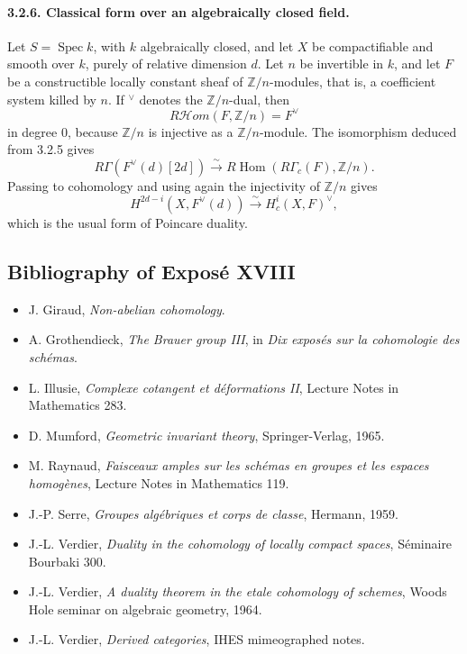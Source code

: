 \documentclass[12pt]{article}
\newcommand{\ZZ}{\mathbb Z}
\DeclareMathOperator{\Spec}{Spec}
\DeclareMathOperator{\Hom}{Hom}
\newcommand{\Hhom}{\mathcal{H}om}
\begin{document}
\paragraph{3.2.6. Classical form over an algebraically closed field.}
Let $S=\Spec k$, with $k$ algebraically closed, and let $X$ be compactifiable and smooth over $k$, purely of relative dimension $d$. Let $n$ be invertible in $k$, and let $F$ be a constructible locally constant sheaf of $\ZZ/n$-modules, that is, a coefficient system killed by $n$. If $^\vee$ denotes the $\ZZ/n$-dual, then
\[
   R\Hhom(F,\ZZ/n)=F^\vee
\]
in degree $0$, because $\ZZ/n$ is injective as a $\ZZ/n$-module. The isomorphism deduced from 3.2.5 gives
\begin{equation}
   R\Gamma(F^\vee(d)[2d])\xrightarrow{\sim}R\Hom(R\Gamma_c(F),\ZZ/n). \tag{3.2.6.1}
\end{equation}
Passing to cohomology and using again the injectivity of $\ZZ/n$ gives
\begin{equation}
   H^{2d-i}(X,F^\vee(d))\xrightarrow{\sim}H_c^i(X,F)^\vee, \tag{3.2.6.2}
\end{equation}
which is the usual form of Poincare duality.

\subsection*{Bibliography of Expos\'e XVIII}

\begin{itemize}
\item J. Giraud, \emph{Non-abelian cohomology}.
\item A. Grothendieck, \emph{The Brauer group III}, in \emph{Dix expos\'es sur la cohomologie des sch\'emas}.
\item L. Illusie, \emph{Complexe cotangent et d\'eformations II}, Lecture Notes in Mathematics 283.
\item D. Mumford, \emph{Geometric invariant theory}, Springer-Verlag, 1965.
\item M. Raynaud, \emph{Faisceaux amples sur les sch\'emas en groupes et les espaces homog\`enes}, Lecture Notes in Mathematics 119.
\item J.-P. Serre, \emph{Groupes alg\'ebriques et corps de classe}, Hermann, 1959.
\item J.-L. Verdier, \emph{Duality in the cohomology of locally compact spaces}, S\'eminaire Bourbaki 300.
\item J.-L. Verdier, \emph{A duality theorem in the etale cohomology of schemes}, Woods Hole seminar on algebraic geometry, 1964.
\item J.-L. Verdier, \emph{Derived categories}, IHES mimeographed notes.
\end{itemize}
\end{document}
